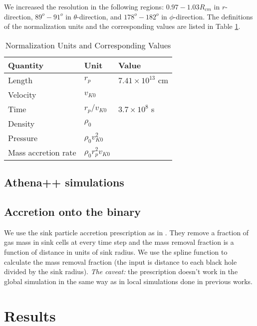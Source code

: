 \documentclass[twocolumn]{aastex631}
\begin{document}
We increased the resolution in the following regions: $0.97-1.03 R_{cm}$ in $r$-direction, $89^o-91^o$ in $\theta$-direction, and $178^o-182^o$ in $\phi$-direction. 
The definitions of the normalization units and the corresponding values are listed in Table \ref{tab:units}.
%
\begin{table}[]
    \label{tab:units}
    \caption{Normalization Units and Corresponding Values}
    \begin{tabular}{lll}
    \hline \hline
    Quantity            & Unit                  & Value                   \\ \hline
    Length              & $r_p$                 & $7.41\times 10^{13}$ cm \\
    Velocity            & $v_{K0}$              &                         \\
    Time                & $r_p/v_{K0}$          & $3.7 \times 10^8$ s     \\
    Density             & $\rho_0$              &                         \\
    Pressure            & $\rho_0 v_{K0}^2$     &                         \\
    Mass accretion rate & $\rho_0 r_p^2 v_{K0}$ &                         \\ \hline
    \end{tabular}
\end{table}
%

\subsection{Athena++ simulations}

\subsection{Accretion onto the binary}
We use the sink particle accretion prescription as in \citet{Munoz2019}. They remove a fraction of gas 
mass in sink cells at every time step and the mass removal fraction is a function of distance in units of sink radius. 
We use the spline function to calculate the mass removal fraction (the input is distance to each black hole divided by the sink radius).
\textit{The caveat:} the prescription doesn't work in the global simulation in the same way as in local simulations done in previous works. 

\section{Results}
\label{sec:results}
\end{document}
